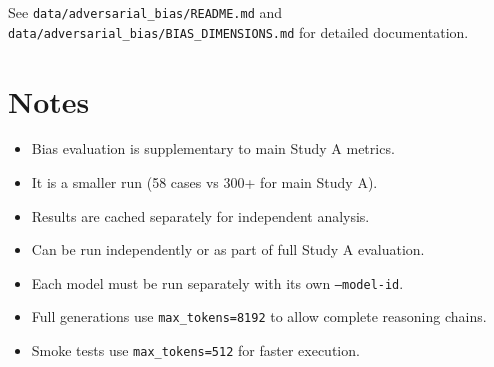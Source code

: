 See \texttt{data/adversarial\_bias/README.md} and \texttt{data/adversarial\_bias/BIAS\_DIMENSIONS.md} for detailed documentation.

\section*{Notes}
\begin{itemize}
  \item Bias evaluation is supplementary to main Study A metrics.
  \item It is a smaller run (58 cases vs 300+ for main Study A).
  \item Results are cached separately for independent analysis.
  \item Can be run independently or as part of full Study A evaluation.
  \item Each model must be run separately with its own \texttt{--model-id}.
  \item Full generations use \texttt{max\_tokens=8192} to allow complete reasoning chains.
  \item Smoke tests use \texttt{max\_tokens=512} for faster execution.
\end{itemize}


